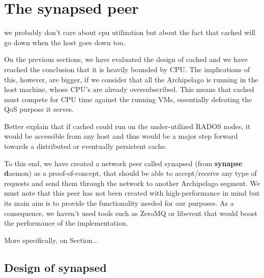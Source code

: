 \chapter{The synapsed peer}\label{ch:synapsed}

\fixme we probably don't care about cpu utilization but about the fact that 
cached will go down when the host goes down too.

On the previous sections, we have evaluated the design of cached and we have 
reached the conclusion that it is heavily bounded by CPU. The implications of 
this, however, are bigger, if we consider that all the Archipelago is running 
in the host machine, whose CPU's are already oversubscribed. This means that 
cached must compete for CPU time against the running VMs, essentially defeating 
the QoS purpose it serves.

\todo Better explain that if cached could run on the under-utilized RADOS 
nodes, it would be accessible from any host and thus would be a major step 
forward towards a distributed or eventually persistent cache.

\begin{comment}
On the other hand, on the RADOS nodes, the CPUs and RAM are not used to their 
full potential. Also, since these nodes are accessible from any host, it would 
be a step forward in making cached distributed if cached could run there.

Thus, it would be interesting to check how well cached (and Archipelago in 
general) would behave, if the VM's data where sent initially over network and 
then handled by the vlmcd. So what we mean is to turn the current situation 
from how it is in Figure \ref{fig:new_sxima.pdf} to the following:

\fixme add figure for network
\end{comment}

To this end, we have created a network peer called synapsed (from 
\textbf{synapse d}aemon) as a proof-of-concept, that should be able to 
accept/receive any type of requests and send them through the network to 
another Archipelago segment. We must note that this peer has not been created 
with high-performance in mind but its main aim is to provide the functionality 
needed for our purposes.  As a consequence, we haven't used tools such as 
ZeroMQ or libevent that would boost the performance of the implementation.

More specifically, on Section...

\section{Design of synapsed}

